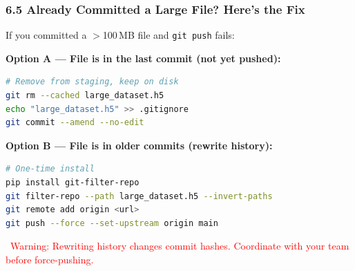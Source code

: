 \documentclass{beamer}
\begin{document}
\begin{frame}[fragile]
\frametitle{6.5 Already Committed a Large File? Here's the Fix}

If you committed a $>$100\,MB file and \texttt{git push} fails:

\textbf{Option A --- File is in the last commit (not yet pushed):}
\begin{lstlisting}[language=bash]
# Remove from staging, keep on disk
git rm --cached large_dataset.h5
echo "large_dataset.h5" >> .gitignore
git commit --amend --no-edit
\end{lstlisting}

\textbf{Option B --- File is in older commits (rewrite history):}
\begin{lstlisting}[language=bash]
# One-time install
pip install git-filter-repo
git filter-repo --path large_dataset.h5 --invert-paths
git remote add origin <url>
git push --force --set-upstream origin main
\end{lstlisting}

\small\textcolor{red}{\faExclamationTriangle\ Warning: Rewriting history changes commit hashes. Coordinate with your team before force-pushing.}
\end{frame}

\end{document}
